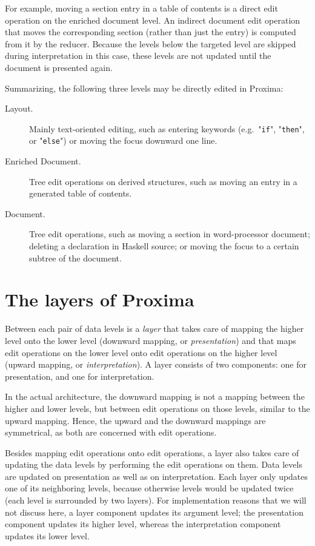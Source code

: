 \documentclass{speauth}
\begin{document}
\bc %
For example, moving a section entry in a table of contents is a direct edit operation on the enriched document level. An indirect document edit operation that moves the corresponding section (rather than just the entry) is computed from it by the reducer. Because the levels below the targeted level are skipped during interpretation in this case, these levels are not updated until the document is presented again.  \ec

\bigskip

Summarizing, the following three levels may be directly edited in Proxima:

\begin{description}
\item[Layout.] Mainly text-oriented editing, such as entering keywords (e.g.\ "\verb|if|", "\verb|then|", or "\verb|else|") or moving the focus downward one line.
\item[Enriched Document.] Tree edit operations on derived structures, such as moving an entry in a generated table of contents.
\item[Document.] Tree edit operations, such as moving a section in word-processor document; deleting a declaration in Haskell source; or moving the focus to a certain subtree of the document.
\end{description}






%																
%																
%																
\section{The layers of Proxima} \label{sect:archProximaLayers}

Between each pair of data levels is a {\em layer} that takes care of mapping the higher level onto the lower level (downward mapping, or {\em presentation}) and that maps edit operations on the lower level onto edit operations on the higher level (upward mapping, or {\em interpretation}). A layer consists of two components: one for presentation, and one for interpretation. 

In the actual architecture, the downward mapping is not a mapping between the higher and lower levels, but between edit operations on those levels, similar to the upward mapping. Hence, the upward and the downward mappings are symmetrical, as both are concerned with edit operations. 

Besides mapping edit operations onto edit operations, a layer also takes care of updating the data levels by performing the edit operations on them. Data levels are updated on presentation as well as on interpretation. Each layer only updates one of its neighboring levels, because otherwise levels would be updated twice (each level is surrounded by two layers). For implementation reasons that we will not discuss here, a layer component updates its argument level; the presentation component updates its higher level, whereas the interpretation component updates its lower level. 
\end{document}
